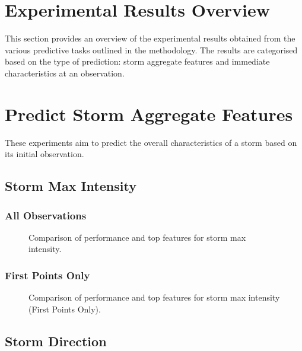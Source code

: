 \section{Experimental Results Overview}

This section provides an overview of the experimental results obtained from the various predictive tasks outlined in the methodology. The results are categorised based on the type of prediction: storm aggregate features and immediate characteristics at an observation.

\section{Predict Storm Aggregate Features}

These experiments aim to predict the overall characteristics of a storm based on its initial observation.

\subsection{Storm Max Intensity}

\subsubsection{All Observations}

\begin{figure}[h]
    \centering
    \caption{Comparison of performance and top features for storm max intensity.}
    \label{fig:storm_max_intensity_summary}
\end{figure}

\subsubsection{First Points Only}

\begin{figure}[h]
    \centering
    \caption{Comparison of performance and top features for storm max intensity (First Points Only).}
    \label{fig:storm_max_intensity_first_points_summary}
\end{figure}

\subsection{Storm Direction}


